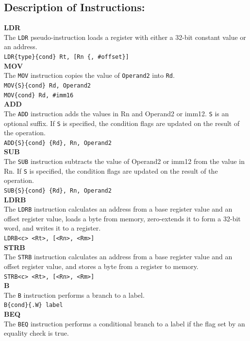 \documentclass[12pt]{article}
\begin{document}
\subsection{Description of Instructions:}
\textbf{LDR}\\
The \verb|LDR| pseudo-instruction loads a register with either a 32-bit constant value or an address.\\
\verb|LDR{type}{cond} Rt, [Rn {, #offset}]| \\
\textbf{MOV}\\
The \verb|MOV| instruction copies the value of \verb|Operand2| into \verb|Rd|.\\
\verb|MOV{S}{cond} Rd, Operand2|\\
\verb|MOV{cond} Rd, #imm16|\\
\textbf{ADD}\\
The \verb|ADD| instruction adds the values in Rn and Operand2 or imm12. \verb|S| is an optional suffix. If \verb|S| is specified, the condition flags are updated on the result of the operation.\\
\verb|ADD{S}{cond} {Rd}, Rn, Operand2|\\
\textbf{SUB}\\
The \verb|SUB| instruction subtracts the value of Operand2 or imm12 from the value in Rn. If \verb|S| is specified, the condition flags are updated on the result of the operation.\\
\verb|SUB{S}{cond} {Rd}, Rn, Operand2|\\
\textbf{LDRB}\\
The \verb|LDRB| instruction calculates an address from a base register value and an offset register value, loads a byte from memory, zero-extends it to form a 32-bit word, and writes it to a register. \\
\verb|LDRB<c> <Rt>, [<Rn>, <Rm>]|\\
\textbf{STRB}\\
The \verb|STRB| instruction calculates an address from a base register value and an offset register value, and stores a byte from a register to memory. \\
\verb|STRB<c> <Rt>, [<Rn>, <Rm>]|\\
\textbf{B}\\
The \verb|B| instruction performs a branch to a label.\\
\verb|B{cond}{.W} label|\\
\textbf{BEQ}\\
The \verb|BEQ| instruction performs a conditional branch to a label if the flag set by an equality check is true.\\
\end{document}

